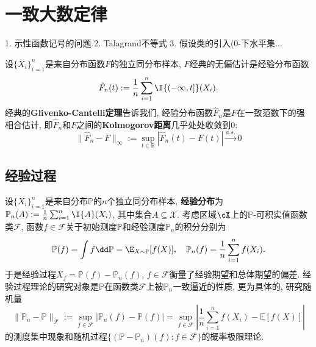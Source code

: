 \section{一致大数定律}

1. 示性函数记号的问题
2. Talagrand不等式
3. 假设类的引入(0-下水平集...
 
设$\{X_i\}_{i=1}^n$是来自分布函数$F$的独立同分布样本, $F$经典的无偏估计是经验分布函数
\begin{equation*}
	\hat F_n(t) 
	:= \frac{1}{n} \sum_{i=1}^n \I{(-\infty, t]}(X_i). 
\end{equation*}
经典的\textbf{Glivenko-Cantelli定理}告诉我们, 经验分布函数$\hat F_n$是$F$在一致范数下的强相合估计, 即$\hat F_n$和$F$之间的\textbf{Kolmogorov距离}几乎处处收敛到$0$: 
\begin{equation*}
	\|\hat F_n - F\|_{\infty} 
	:= \sup_{t \in \mathbb{R}} |\hat F_n(t) - F(t)| \stackrel{a.s.}{\to} 0
\end{equation*}

%


\subsection{经验过程}

设$\{X_i\}_{i=1}^n$是来自分布$\mathbb{P}$的$n$个独立同分布样本, \textbf{经验分布}为$\mathbb{P}_n(A) := \frac{1}{n} \sum_{i=1}^n \I{A}(X_i)$, 其中集合$A \subseteq \mathcal{X}$. 
考虑区域$\cX$上的$\mathbb{P}$-可积实值函数类$\mathscr{F}$, 函数$f \in \mathscr{F}$关于初始测度$\mathbb{P}$和经验测度$\mathbb{P}_n$的积分分别为 
\begin{equation*}
	\mathbb{P}(f) = \int f \dd \mathbb{P} = \E_{X \sim \mathbb{P}} [f(X)], \quad
	\mathbb{P}_n(f) = \frac{1}{n} \sum_{i=1}^n f(X_i). 
\end{equation*}
于是经验过程$X_f = \mathbb{P}(f) - \mathbb{P}_n(f)$, $f \in \mathscr{F}$衡量了经验期望和总体期望的偏差. 
经验过程理论的研究对象是$\mathbb{P}$在函数类$\mathscr{F}$上被$\mathbb{P}_n$一致逼近的性质, 更为具体的, 研究随机量 
\begin{equation*}
	\|\mathbb{P}_n - \mathbb{P}\|_{\mathscr{F}} 
	:= \sup_{f \in\mathscr{F}} \left| \mathbb{P}_n(f) - \mathbb{P}(f) \right|
	= \sup_{f \in\mathscr{F}} \left| \frac{1}{n} \sum_{i=1}^n f(X_i) - \mathbb{E}[f(X)] \right|
\end{equation*}
的测度集中现象和随机过程$\{(\mathbb{P} - \mathbb{P}_n)(f) \colon f \in \mathscr{F}\}$的概率极限理论. 

